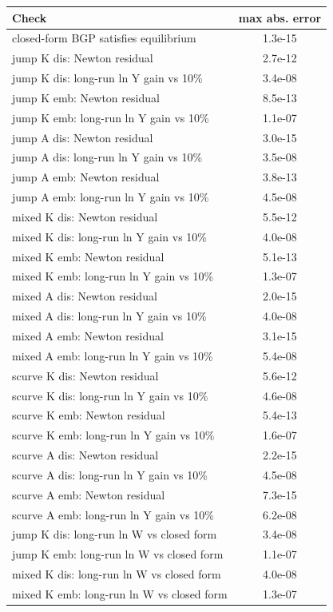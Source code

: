 \begin{tabular}{lc}\toprule Check & max abs. error\\\midrule
closed-form BGP satisfies equilibrium & 1.3e-15\\
jump K dis: Newton residual & 2.7e-12\\
jump K dis: long-run ln Y gain vs 10\% & 3.4e-08\\
jump K emb: Newton residual & 8.5e-13\\
jump K emb: long-run ln Y gain vs 10\% & 1.1e-07\\
jump A dis: Newton residual & 3.0e-15\\
jump A dis: long-run ln Y gain vs 10\% & 3.5e-08\\
jump A emb: Newton residual & 3.8e-13\\
jump A emb: long-run ln Y gain vs 10\% & 4.5e-08\\
mixed K dis: Newton residual & 5.5e-12\\
mixed K dis: long-run ln Y gain vs 10\% & 4.0e-08\\
mixed K emb: Newton residual & 5.1e-13\\
mixed K emb: long-run ln Y gain vs 10\% & 1.3e-07\\
mixed A dis: Newton residual & 2.0e-15\\
mixed A dis: long-run ln Y gain vs 10\% & 4.0e-08\\
mixed A emb: Newton residual & 3.1e-15\\
mixed A emb: long-run ln Y gain vs 10\% & 5.4e-08\\
scurve K dis: Newton residual & 5.6e-12\\
scurve K dis: long-run ln Y gain vs 10\% & 4.6e-08\\
scurve K emb: Newton residual & 5.4e-13\\
scurve K emb: long-run ln Y gain vs 10\% & 1.6e-07\\
scurve A dis: Newton residual & 2.2e-15\\
scurve A dis: long-run ln Y gain vs 10\% & 4.5e-08\\
scurve A emb: Newton residual & 7.3e-15\\
scurve A emb: long-run ln Y gain vs 10\% & 6.2e-08\\
jump K dis: long-run ln W vs closed form & 3.4e-08\\
jump K emb: long-run ln W vs closed form & 1.1e-07\\
mixed K dis: long-run ln W vs closed form & 4.0e-08\\
mixed K emb: long-run ln W vs closed form & 1.3e-07\\

\end{tabular}
